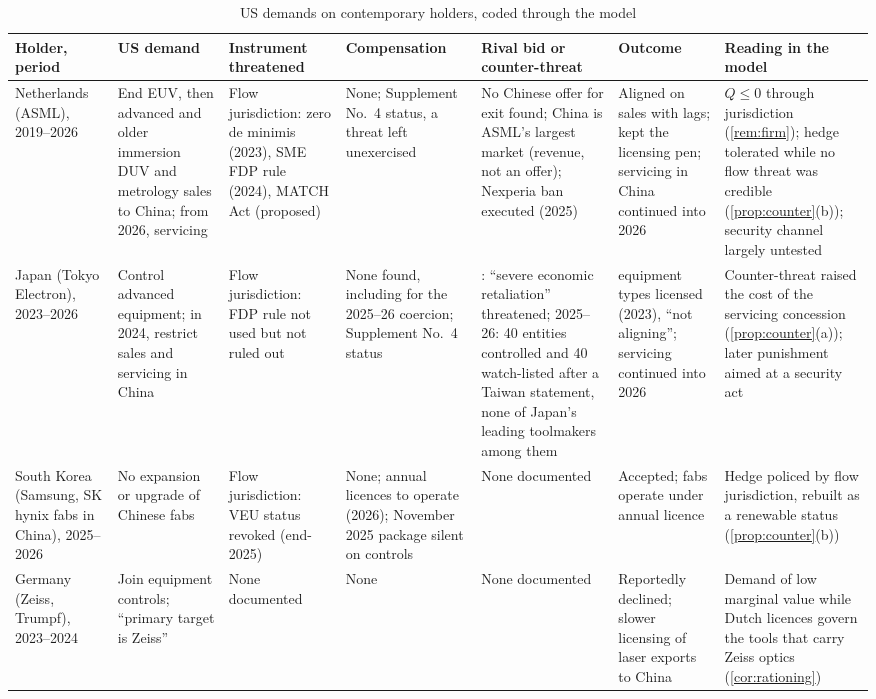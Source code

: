 \begin{table}[tp]
\centering
\scriptsize
\setlength{\tabcolsep}{2.5pt}
\caption{US demands on contemporary holders, coded through the model}\label{tab:cases}
\begin{tabularx}{\textwidth}{@{}>{\raggedright\arraybackslash}p{1.7cm}*{6}{>{\raggedright\arraybackslash}X}@{}}
\toprule
Holder, period & US demand & Instrument threatened & Compensation & Rival bid or counter-threat & Outcome & Reading in the model\\
\midrule
Netherlands (ASML), 2019--2026 & End EUV, then advanced and older immersion DUV and metrology sales to China; from 2026, servicing & Flow jurisdiction: zero de minimis (2023), SME FDP rule (2024), MATCH Act (proposed) & None; Supplement No.~4 status, a threat left unexercised & No Chinese offer for exit found; China is ASML's largest market (revenue, not an offer); Nexperia ban executed (2025) & Aligned on sales with lags; kept the licensing pen; servicing in China continued into 2026 & $Q\le0$ through jurisdiction (\cref{rem:firm}); hedge tolerated while no flow threat was credible (\cref{prop:counter}(b)); security channel largely untested\\
\addlinespace
Japan (Tokyo Electron), 2023--2026 & Control advanced equipment; in 2024, restrict sales and servicing in China & Flow jurisdiction: FDP rule not used but not ruled out & None found, including for the 2025--26 coercion; Supplement No.~4 status & 2024: ``severe economic retaliation'' threatened; 2025--26: 40 entities controlled and 40 watch-listed after a Taiwan statement, none of Japan's leading toolmakers among them & 23 equipment types licensed (2023), ``not aligning''; servicing continued into 2026 & Counter-threat raised the cost of the servicing concession (\cref{prop:counter}(a)); later punishment aimed at a security act\\
\addlinespace
South Korea (Samsung, SK hynix fabs in China), 2025--2026 & No expansion or upgrade of Chinese fabs & Flow jurisdiction: VEU status revoked (end-2025) & None; annual licences to operate (2026); November 2025 package silent on controls & None documented & Accepted; fabs operate under annual licence & Hedge policed by flow jurisdiction, rebuilt as a renewable status (\cref{prop:counter}(b))\\
\addlinespace
Germany (Zeiss, Trumpf), 2023--2024 & Join equipment controls; ``primary target is Zeiss'' & None documented & None & None documented & Reportedly declined; slower licensing of laser exports to China & Demand of low marginal value while Dutch licences govern the tools that carry Zeiss optics (\cref{cor:rationing})\\

\end{tabularx}
\end{table}
